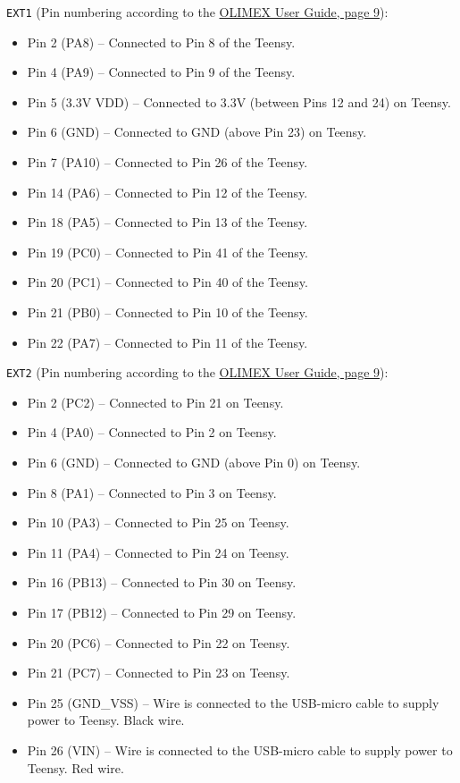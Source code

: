 \verb|EXT1| (Pin numbering according to the \href{https://www.olimex.com/Products/ARM/ST/STM32-H405/resources/STM32-H405_UM.pdf}{OLIMEX User Guide, page 9}):
\begin{itemize}[noitemsep]
  \item Pin 2 (PA8) -- Connected to Pin 8 of the Teensy.
  \item Pin 4 (PA9) -- Connected to Pin 9 of the Teensy.
  \item Pin 5 (3.3V VDD) -- Connected to 3.3V (between Pins 12 and 24) on Teensy.
  \item Pin 6 (GND) -- Connected to GND (above Pin 23) on Teensy.
  \item Pin 7 (PA10) -- Connected to Pin 26 of the Teensy.
  \item Pin 14 (PA6) -- Connected to Pin 12 of the Teensy.
  \item Pin 18 (PA5) -- Connected to Pin 13 of the Teensy.
  \item Pin 19 (PC0) -- Connected to Pin 41 of the Teensy.
  \item Pin 20 (PC1) -- Connected to Pin 40 of the Teensy.
  \item Pin 21 (PB0) -- Connected to Pin 10 of the Teensy.
  \item Pin 22 (PA7) -- Connected to Pin 11 of the Teensy.
\end{itemize}

\verb|EXT2| (Pin numbering according to the \href{https://www.olimex.com/Products/ARM/ST/STM32-H405/resources/STM32-H405_UM.pdf}{OLIMEX User Guide, page 9}):
\begin{itemize}[noitemsep]
  \item Pin 2 (PC2) -- Connected to Pin 21 on Teensy.
  \item Pin 4 (PA0) -- Connected to Pin 2 on Teensy.
  \item Pin 6 (GND) -- Connected to GND (above Pin 0) on Teensy.
  \item Pin 8 (PA1) -- Connected to Pin 3 on Teensy.
  \item Pin 10 (PA3) -- Connected to Pin 25 on Teensy.
  \item Pin 11 (PA4) -- Connected to Pin 24 on Teensy.
  \item Pin 16 (PB13) -- Connected to Pin 30 on Teensy.
  \item Pin 17 (PB12) -- Connected to Pin 29 on Teensy.
  \item Pin 20 (PC6) -- Connected to Pin 22 on Teensy.
  \item Pin 21 (PC7) -- Connected to Pin 23 on Teensy.
  \item Pin 25 (GND\_VSS) -- Wire is connected to the USB-micro cable to supply power to Teensy. Black wire.
  \item Pin 26 (VIN) -- Wire is connected to the USB-micro cable to supply power to Teensy. Red wire.
\end{itemize}

